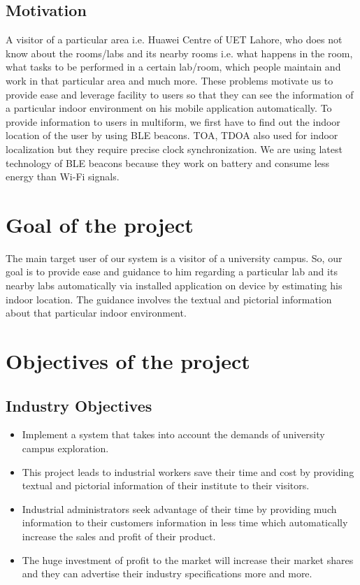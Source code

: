 \documentclass{article}
\begin{document}
\subsection{Motivation}
A visitor of a particular area i.e. Huawei Centre of UET Lahore, who does not know about the rooms/labs and its nearby rooms i.e. what happens in the room, what tasks to be performed in a certain lab/room, which people maintain and work in that particular area and much more. These problems motivate us to provide ease and leverage facility to users so that they can see the information of a particular indoor environment on his mobile application automatically. To provide information to users in multiform, we first have to find out the indoor location of the user by using BLE beacons. TOA, TDOA also used for indoor localization but they require precise clock synchronization.\cite{research3} We are using latest technology of BLE beacons because they work on battery and consume less energy than Wi-Fi signals.
\section{Goal of the project}
The main target user of our system is a visitor of a university campus. So, our goal is to provide ease and guidance to him regarding a particular lab and its nearby labs automatically via installed application on device by estimating his indoor location. The guidance involves the textual and pictorial information about that particular indoor environment.
\section{Objectives of the project}
\subsection{Industry Objectives}
\begin{itemize}
\item Implement a system that takes into account the demands of university campus exploration.
\item This project leads to industrial workers save their time and cost by providing textual and pictorial information of their institute to their visitors.
\item Industrial administrators seek advantage of their time by providing much information to their customers information in less time which automatically increase the sales and profit of their product.
\item The huge investment of profit to the market will increase their market shares and they can advertise their industry specifications more and more.


\end{itemize}
\end{document}
